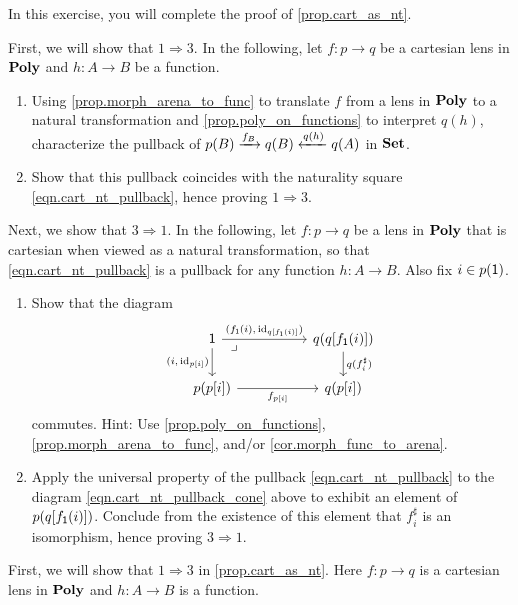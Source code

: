 \documentclass[Book-Poly]{subfiles}
\begin{document}
\begin{exercise} \label{exc.cart_as_nt}
In this exercise, you will complete the proof of \cref{prop.cart_as_nt}.

First, we will show that $1\Rightarrow3$.
In the following, let $f\colon p\to q$ be a cartesian lens in $\mathbf{Poly}$ and $h\colon A\to B$ be a function.
\begin{enumerate}
    \item Using \cref{prop.morph_arena_to_func} to translate $f$ from a lens in $\mathbf{Poly}$ to a natural transformation and \cref{prop.poly_on_functions} to interpret $q(h)$, characterize the pullback of $p(B)\xrightarrow{f_B}q(B)\xleftarrow{q(h)}q(A)$ in $\mathbf{Set}$.
    \item Show that this pullback coincides with the naturality square \eqref{eqn.cart_nt_pullback}, hence proving $1\Rightarrow3$.
\end{enumerate}
Next, we show that $3\Rightarrow1$.
In the following, let $f\colon p\to q$ be a lens in $\mathbf{Poly}$ that is cartesian when viewed as a natural transformation, so that \eqref{eqn.cart_nt_pullback} is a pullback for any function $h\colon A\to B$.
Also fix $i\in p(\textsf{1})$.
\begin{enumerate}[resume]
    \item Show that the diagram 
    \begin{equation} \label{eqn.cart_nt_pullback_cone}
        \begin{tikzcd}[column sep=50pt]
        	\1 \ar[r, "{(f_\1(i),\,\id_{q[f_\1(i)]})}"]\ar[d, "{(i,\,\id_{p[i]})}"']&
        	q(q[f_\1(i)])\ar[d, "q(f^\sharp_i)"]\\
        	p(p[i])\ar[r, "f_{p[i]}"']&
        	q(p[i])\ar[ul, phantom, very near end, "\lrcorner"]
        \end{tikzcd}
    \end{equation}
    commutes.
    Hint: Use \cref{prop.poly_on_functions}, \cref{prop.morph_arena_to_func}, and/or \cref{cor.morph_func_to_arena}.
    \item Apply the universal property of the pullback \eqref{eqn.cart_nt_pullback} to the diagram \eqref{eqn.cart_nt_pullback_cone} above to exhibit an element of $p(q[f_{\textsf{1}}(i)])$.
    Conclude from the existence of this element that $f^\sharp_i$ is an isomorphism, hence proving $3\Rightarrow1$.\qedhere
\end{enumerate}
\begin{solution}
First, we will show that $1\Rightarrow3$ in \cref{prop.cart_as_nt}.
Here $f\colon p\to q$ is a cartesian lens in $\mathbf{Poly}$ and $h\colon A\to B$ is a function.

\end{solution}
\end{exercise}
\end{document}
